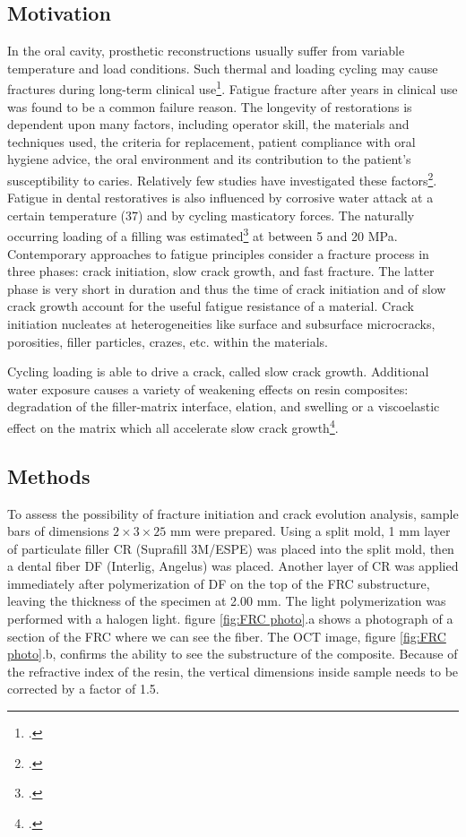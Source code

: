 \documentclass[12pt,twoside,english]{book}
\renewcommand{\~}{\perispomeni}%
\numberwithin{equation}{section}
\numberwithin{figure}{section}
\begin{document}
\subsection{Motivation}

In the oral cavity, prosthetic reconstructions usually suffer from variable temperature and load conditions. Such thermal and loading cycling may cause fractures during long-term clinical use\footcite{Rantala:2003p2481,Lassila:2004p2512}. Fatigue fracture after years in clinical use was found to be a common failure reason. The longevity of restorations is dependent upon many factors, including operator skill, the materials and techniques used, the criteria for replacement, patient compliance with oral hygiene advice, the oral environment and its contribution to the patient\textquoteright{}s susceptibility to caries. Relatively few studies have investigated these factors\footcite{Burke:2001p2517}. Fatigue in dental restoratives is also influenced by corrosive water attack at a certain temperature (37\textdegree{}) and by cycling masticatory forces. The naturally occurring loading of a filling was estimated\footcite{Braem:1994p2520} at between 5 and 20 MPa. Contemporary approaches to fatigue principles consider a fracture process in three phases: crack initiation, slow crack growth, and fast fracture. The latter phase is very short in duration and thus the time of crack initiation and of slow crack growth account for the useful fatigue resistance of a material. Crack initiation nucleates at heterogeneities like surface and subsurface microcracks, porosities, filler particles, crazes, etc. within the materials. 

Cycling loading is able to drive a crack, called slow crack growth. Additional water exposure causes a variety of weakening effects on resin composites: degradation of the filler-matrix interface, elation, and swelling or a viscoelastic effect on the matrix which all accelerate slow crack growth\footcite{Soderholm:1990p2521}. 
\subsection{Methods}
To assess the possibility of fracture initiation and crack evolution analysis, sample bars of dimensions $2\times3\times25$ mm were prepared. Using a split mold, 1 mm layer of particulate filler CR (Suprafill 3M/ESPE) was placed into the split mold, then a dental fiber DF (Interlig, Angelus) was placed. Another layer of CR was applied immediately after polymerization of DF on the top of the \gls{FRC} substructure, leaving the thickness of the specimen at 2.00 mm. The light polymerization was performed with a halogen light. figure \ref{fig:FRC photo}.a shows a photograph of a section of the FRC where we can see the fiber. The OCT image, figure \ref{fig:FRC photo}.b, confirms the ability to see the substructure of the composite. Because of the refractive index of the resin, the vertical dimensions inside sample needs to be corrected by a factor of 1.5. 
\end{document}
